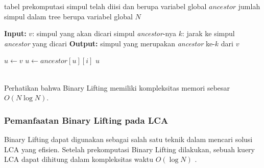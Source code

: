 \documentclass[12pt,a4paper]{article}
\begin{document}
\begin{algorithm}[H]
    \caption{Teknik Binary Lifting untuk menemukan \textit{ancestor} ke-$k$ suatu simpul} \label{alg:kth-ancestor}
    \begin{algorithmic}

        \Require tabel prekomputasi simpul telah diisi dan berupa variabel global $ancestor$
        \Require jumlah simpul dalam tree berupa variabel global $N$
        \Statex

            \State \textbf{Input:} \; $v$: simpul yang akan dicari simpul \textit{ancestor}-nya
            \State \qquad \qquad $k$: jarak ke simpul \textit{ancestor} yang dicari
            \State \textbf{Output:} simpul yang merupakan \textit{ancestor} ke-$k$ dari $v$
            \Statex

            \State $u \gets v$
                    \State $u \gets ancestor[u][i]$
                \EndIf
            \EndFor
            \State \Return $u$

        \EndFunction

    \end{algorithmic}
\end{algorithm} \\

Perhatikan bahwa Binary Lifting memiliki kompleksitas memori sebesar $O(N \log N)$.

\subsubsection{Pemanfaatan Binary Lifting pada LCA}

Binary Lifting dapat digunakan sebagai salah satu teknik dalam mencari solusi LCA yang efisien.
Setelah prekomputasi Binary Lifting dilakukan, sebuah kuery LCA dapat dihitung dalam kompleksitas waktu $O(\log N)$ \cite{cp-binlift}. \\
\end{document}
